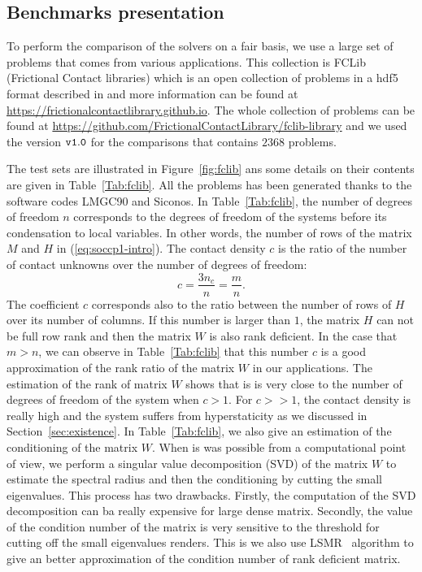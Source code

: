 \subsection{Benchmarks presentation}


To perform the comparison of the solvers on a fair basis, we use a large set of problems that comes from various applications. This collection is FCLib (Frictional Contact libraries)  which is an open collection of problems in a hdf5 format described in \citep{acary:hal-00945820} and more information can be found at \href{https://frictionalcontactlibrary.github.io}{https://frictionalcontactlibrary.github.io}. The whole collection of problems can be found at \href{https://github.com/FrictionalContactLibrary/fclib-library}{https://github.com/FrictionalContactLibrary/fclib-library} and we used the version $\tt v1.0$ for the comparisons that contains $2368$ problems.

The test sets are illustrated in Figure~\ref{fig:fclib} ans some details on their contents are given in Table~\ref{Tab:fclib}. All the problems has been generated thanks to the software codes LMGC90 and Siconos. In Table~\ref{Tab:fclib}, the number of degrees of freedom $n$ corresponds to the degrees of freedom of the systems before its condensation to local variables. In other words, the number of rows of the matrix $M$ and $H$ in  (\ref{eq:soccp1-intro}). The contact density $c$ is the ratio of the number of contact unknowns over the number of degrees of freedom:
\begin{equation}
  \label{eq:fclib-1}
  c= \frac {3 n_c }{ n} = \frac {m} {n}.
\end{equation}
 The coefficient $c$ corresponds also to the ratio between the number of rows of $H$ over its number of columns. If this number is larger than $1$, the matrix $H$ can not be full row rank and then the matrix $W$ is also rank deficient. In the case that $m >n$, we can observe in Table~\ref{Tab:fclib} that  this number $c$ is a good approximation of the rank ratio of the matrix $W$ in our applications. The estimation of the rank of matrix $W$ shows that is is very close to the number of degrees of freedom of the system when $c>1$. For $c >> 1$, the contact density is really high and the system suffers from hyperstaticity as we discussed in Section~\ref{sec:existence}. In Table~\ref{Tab:fclib}, we also give an estimation of the conditioning of the matrix $W$. When is was possible from a computational point of view, we perform a singular value decomposition (SVD) of the matrix $W$ to estimate the spectral radius and then the conditioning by cutting the small eigenvalues. This process has two drawbacks. Firstly, the computation of the SVD decomposition can ba really expensive for large dense matrix. Secondly, the value of the condition number of the matrix is very sensitive to the threshold for cutting off the small eigenvalues renders. This is we also use LSMR~\citep{Fong.Saunders_SISC2011} algorithm to give an better approximation of the condition number of rank deficient matrix. 

